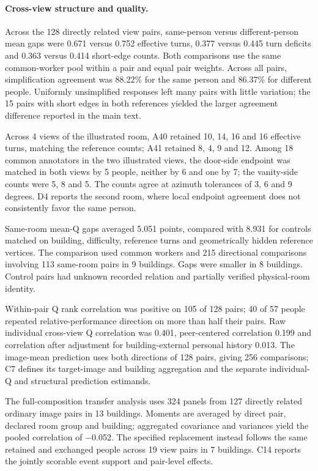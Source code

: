 \paragraph{Cross-view structure and quality.}
Across the 128 directly related view pairs, same-person versus different-person mean gaps were 0.671 versus 0.752 effective turns, 0.377 versus 0.445 turn deficits and 0.363 versus 0.414 short-edge counts. Both comparisons use the same common-worker pool within a pair and equal pair weights. Across all pairs, simplification agreement was 88.22\% for the same person and 86.37\% for different people. Uniformly unsimplified responses left many pairs with little variation; the 15 pairs with short edges in both references yielded the larger agreement difference reported in the main text.

Across 4 views of the illustrated room, A40 retained 10, 14, 16 and 16 effective turns, matching the reference counts; A41 retained 8, 4, 9 and 12. Among 18 common annotators in the two illustrated views, the door-side endpoint was matched in both views by 5 people, neither by 6 and one by 7; the vanity-side counts were 5, 8 and 5. The counts agree at azimuth tolerances of 3, 6 and 9 degrees. D4 reports the second room, where local endpoint agreement does not consistently favor the same person.

Same-room mean-Q gaps averaged 5.051 points, compared with 8.931 for controls matched on building, difficulty, reference turns and geometrically hidden reference vertices. The comparison used common workers and 215 directional comparisons involving 113 same-room pairs in 9 buildings. Gaps were smaller in 8 buildings. Control pairs had unknown recorded relation and partially verified physical-room identity.

Within-pair Q rank correlation was positive on 105 of 128 pairs; 40 of 57 people repeated relative-performance direction on more than half their pairs. Raw individual cross-view Q correlation was 0.401, peer-centered correlation 0.199 and correlation after adjustment for building-external personal history 0.013. The image-mean prediction uses both directions of 128 pairs, giving 256 comparisons; C7 defines its target-image and building aggregation and the separate individual-Q and structural prediction estimands.

The full-composition transfer analysis uses 324 panels from 127 directly related ordinary image pairs in 13 buildings. Moments are averaged by direct pair, declared room group and building; aggregated covariance and variances yield the pooled correlation of $-$0.052. The specified replacement instead follows the same retained and exchanged people across 19 view pairs in 7 buildings. C14 reports the jointly scorable event support and pair-level effects.

